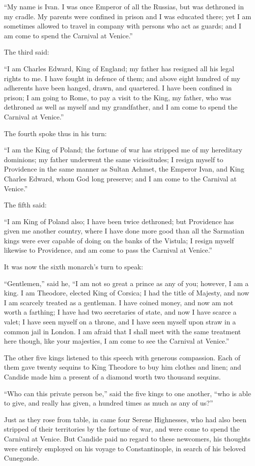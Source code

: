 ``My name is Ivan. I was once Emperor of all the Russias, but was dethroned in my cradle. My parents were confined in prison and I was educated there; yet I am sometimes allowed to travel in company with persons who act as guards; and I am come to spend the Carnival at Venice.''

The third said:

``I am Charles Edward, King of England; my father has resigned all his legal rights to me. I have fought in defence of them; and above eight hundred of my adherents have been hanged, drawn, and quartered. I have been confined in prison; I am going to Rome, to pay a visit to the King, my father, who was dethroned as well as myself and my grandfather, and I am come to spend the Carnival at Venice.''

The fourth spoke thus in his turn:

``I am the King of Poland; the fortune of war has stripped me of my hereditary dominions; my father underwent the same vicissitudes; I resign myself to Providence in the same manner as Sultan Achmet, the Emperor Ivan, and King Charles Edward, whom God long preserve; and I am come to the Carnival at Venice.''

The fifth said:

``I am King of Poland also; I have been twice dethroned; but Providence has given me another country, where I have done more good than all the Sarmatian kings were ever capable of doing on the banks of the Vistula; I resign myself likewise to Providence, and am come to pass the Carnival at Venice.''

It was now the sixth monarch's turn to speak:

``Gentlemen,'' said he, ``I am not so great a prince as any of you; however, I am a king. I am Theodore, elected King of Corsica; I had the title of Majesty, and now I am scarcely treated as a gentleman. I have coined money, and now am not worth a farthing; I have had two secretaries of state, and now I have scarce a valet; I have seen myself on a throne, and I have seen myself upon straw in a common jail in London. I am afraid that I shall meet with the same treatment here though, like your majesties, I am come to see the Carnival at Venice.''

The other five kings listened to this speech with generous compassion. Each of them gave twenty sequins to King Theodore to buy him clothes and linen; and Candide made him a present of a diamond worth two thousand sequins.

``Who can this private person be,'' said the five kings to one another, ``who is able to give, and really has given, a hundred times as much as any of us?''

Just as they rose from table, in came four Serene Highnesses, who had also been stripped of their territories by the fortune of war, and were come to spend the Carnival at Venice. But Candide paid no regard to these newcomers, his thoughts were entirely employed on his voyage to Constantinople, in search of his beloved Cunegonde.


